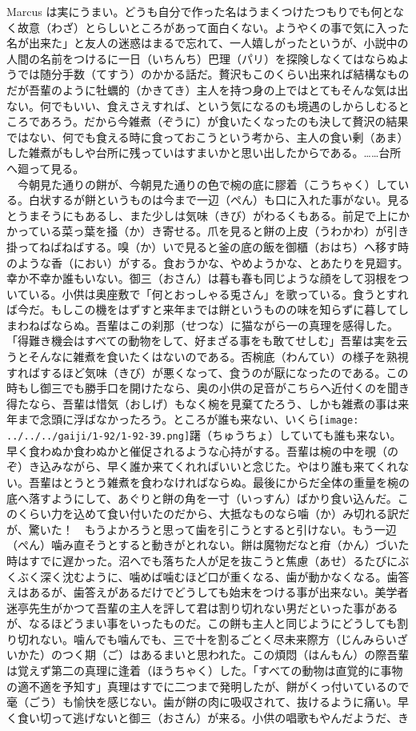 Marcus
は実にうまい。どうも自分で作った名はうまくつけたつもりでも何となく故意（わざ）とらしいところがあって面白くない。ようやくの事で気に入った名が出来た」と友人の迷惑はまるで忘れて、一人嬉しがったというが、小説中の人間の名前をつけるに一日（いちんち）巴理（パリ）を探険しなくてはならぬようでは随分手数（てすう）のかかる話だ。贅沢もこのくらい出来れば結構なものだが吾輩のように牡蠣的（かきてき）主人を持つ身の上ではとてもそんな気は出ない。何でもいい、食えさえすれば、という気になるのも境遇のしからしむるところであろう。だから今雑煮（ぞうに）が食いたくなったのも決して贅沢の結果ではない、何でも食える時に食っておこうという考から、主人の食い剰（あま）した雑煮がもしや台所に残っていはすまいかと思い出したからである。\ldots{}\ldots{}台所へ廻って見る。\\
　今朝見た通りの餅が、今朝見た通りの色で椀の底に膠着（こうちゃく）している。白状するが餅というものは今まで一辺（ぺん）も口に入れた事がない。見るとうまそうにもあるし、また少しは気味（きび）がわるくもある。前足で上にかかっている菜っ葉を掻（か）き寄せる。爪を見ると餅の上皮（うわかわ）が引き掛ってねばねばする。嗅（か）いで見ると釜の底の飯を御櫃（おはち）へ移す時のような香（におい）がする。食おうかな、やめようかな、とあたりを見廻す。幸か不幸か誰もいない。御三（おさん）は暮も春も同じような顔をして羽根をついている。小供は奥座敷で「何とおっしゃる兎さん」を歌っている。食うとすれば今だ。もしこの機をはずすと来年までは餅というものの味を知らずに暮してしまわねばならぬ。吾輩はこの刹那（せつな）に猫ながら一の真理を感得した。「得難き機会はすべての動物をして、好まざる事をも敢てせしむ」吾輩は実を云うとそんなに雑煮を食いたくはないのである。否椀底（わんてい）の様子を熟視すればするほど気味（きび）が悪くなって、食うのが厭になったのである。この時もし御三でも勝手口を開けたなら、奥の小供の足音がこちらへ近付くのを聞き得たなら、吾輩は惜気（おしげ）もなく椀を見棄てたろう、しかも雑煮の事は来年まで念頭に浮ばなかったろう。ところが誰も来ない、いくら\texttt{[image: ../../../gaiji/1-92/1-92-39.png]}躇（ちゅうちょ）していても誰も来ない。早く食わぬか食わぬかと催促されるような心持がする。吾輩は椀の中を覗（のぞ）き込みながら、早く誰か来てくれればいいと念じた。やはり誰も来てくれない。吾輩はとうとう雑煮を食わなければならぬ。最後にからだ全体の重量を椀の底へ落すようにして、あぐりと餅の角を一寸（いっすん）ばかり食い込んだ。このくらい力を込めて食い付いたのだから、大抵なものなら噛（か）み切れる訳だが、驚いた！　もうよかろうと思って歯を引こうとすると引けない。もう一辺（ぺん）噛み直そうとすると動きがとれない。餅は魔物だなと疳（かん）づいた時はすでに遅かった。沼へでも落ちた人が足を抜こうと焦慮（あせ）るたびにぶくぶく深く沈むように、噛めば噛むほど口が重くなる、歯が動かなくなる。歯答えはあるが、歯答えがあるだけでどうしても始末をつける事が出来ない。美学者迷亭先生がかつて吾輩の主人を評して君は割り切れない男だといった事があるが、なるほどうまい事をいったものだ。この餅も主人と同じようにどうしても割り切れない。噛んでも噛んでも、三で十を割るごとく尽未来際方（じんみらいざいかた）のつく期（ご）はあるまいと思われた。この煩悶（はんもん）の際吾輩は覚えず第二の真理に逢着（ほうちゃく）した。「すべての動物は直覚的に事物の適不適を予知す」真理はすでに二つまで発明したが、餅がくっ付いているので毫（ごう）も愉快を感じない。歯が餅の肉に吸収されて、抜けるように痛い。早く食い切って逃げないと御三（おさん）が来る。小供の唱歌もやんだようだ、き